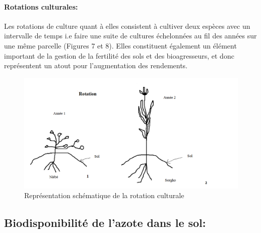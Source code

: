 \documentclass[a4paper,11pt]{article}
\begin{document}
\paragraph{Rotations culturales:}

Les rotations de culture quant à elles consistent à cultiver deux
espèces avec un intervalle de temps i.e faire une suite de cultures
échelonnées au fil des années sur une même parcelle (Figures 7 et
8). Elles constituent également un élément important de la gestion de
la fertilité des sols et des bioagresseurs, et donc représentent un
atout pour l’augmentation des rendements.

\begin{figure}%
  \begin{center}
   \includegraphics[width=18cm]{images/Rotation}
\end{center}
\caption{ Représentation schématique de la rotation culturale}
\end{figure}


\subsection{Biodisponibilité de l’azote dans le sol:}
\end{document}
